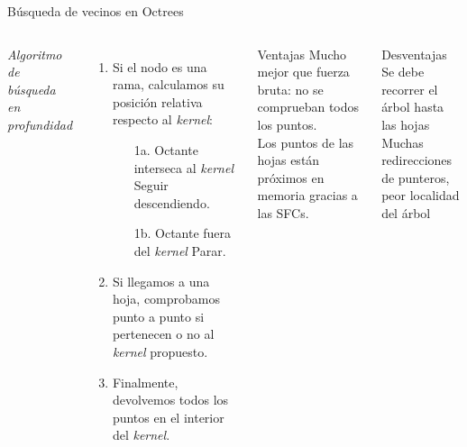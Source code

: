 \documentclass[aspectratio=169]{beamer}
\begin{document}
\begin{frame}{Búsqueda de vecinos en Octrees}
    \begin{columns}
    \textit{Algoritmo de búsqueda en profundidad}
    \vspace{1em}
        \begin{enumerate}
            \item Si el nodo es una rama, calculamos su posición relativa respecto al \textit{kernel}:
            \begin{enumerate}
                \item[1a.] Octante interseca al \textit{kernel} \textrightarrow\: Seguir descendiendo.
                \item[1b.] Octante fuera del \textit{kernel} \textrightarrow\:  Parar.
            \end{enumerate}
            \item Si llegamos a una hoja, comprobamos punto a punto si pertenecen o no al \textit{kernel} propuesto. 
            \item Finalmente, devolvemos todos los puntos en el interior del \textit{kernel}.
        \end{enumerate}
        \begin{exampleblock}{Ventajas}
            \textrightarrow \: Mucho mejor que fuerza bruta: no se comprueban todos los puntos. \\
            \textrightarrow \: Los puntos de las hojas están próximos en memoria gracias a las SFCs. \\
        \end{exampleblock}
        \begin{alertblock}{Desventajas}
            \textrightarrow \: Se debe recorrer el árbol hasta las hojas \\
            \textrightarrow \: Muchas redirecciones de punteros, peor localidad del árbol \\
        \end{alertblock}
    \end{columns}
\end{frame}
\end{document}
